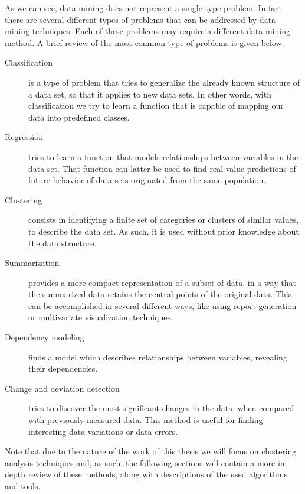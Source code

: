 As we can see, data mining does not represent a single type problem. In fact
there are several different types of problems that can be addressed by data
mining techniques. Each of these problems may require a different data mining
method. A brief review of the most common type of problems is given below.

\begin{description}

  \item[Classification]
  is a type of problem that tries to generalize the already known structure of a
  data set, so that it applies to new data sets. In other words, with
  classification we try to learn a function that is capable of mapping our data
  into predefined classes.

  \item[Regression]
  tries to learn a function that models relationships between variables in the
  data set. That function can latter be used to find real value predictions of
  future behavior of data sets originated from the same population.

  \item[Clustering]
  consists in identifying a finite set of categories or clusters of similar
  values, to describe the data set. As such, it is used without prior knowledge
  about the data structure.

  \item[Summarization]
  provides a more compact representation of a subset of data, in a way that the
  summarized data retains the central points of the original data. This can be
  accomplished in several different ways, like using report generation or
  multivariate visualization techniques.

  \item[Dependency modeling]
  finds a model which describes relationships between variables, revealing their
  dependencies.

  \item[Change and deviation detection]
  tries to discover the most significant changes in the data, when compared with
  previously measured data. This method is useful for finding interesting data
  variations or data errors.

\end{description}

Note that due to the nature of the work of this thesis we will focus on
clustering analysis techniques and, as such, the following sections will contain
a more in-depth review of these methods, along with descriptions of the used
algorithms and tools.

